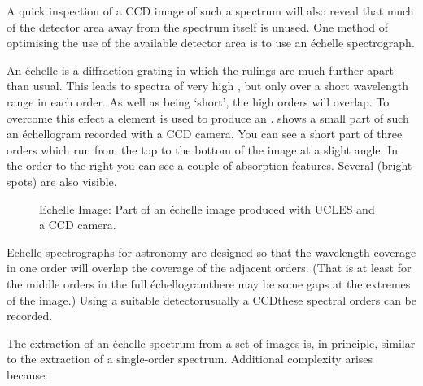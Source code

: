 A quick inspection of a CCD image of such a spectrum will also reveal
that much of the detector area away from the spectrum itself is unused.
One method of optimising the use of the available detector area is to
use an \'{e}chelle spectrograph.

An \'{e}chelle is a diffraction grating in which the rulings are much
further apart than usual.
This leads to spectra of very high ,
but only over a short wavelength range in each order.
As well as being `short', the high orders will overlap.  To overcome
this effect a 
element is used to produce an
.
shows a small part of such
an \'{e}chellogram recorded with a CCD camera.  You can see a short part
of three orders which run from the top to the bottom of the image at a
slight angle.  In the order to the right you can see a couple of
absorption features.  Several 
(bright spots) are also visible.

\begin{figure}
\begin{center}
{\leavevmode\epsfysize=136mm}

\parbox{140mm}{
\caption{Echelle Image: Part of an \'{e}chelle image produced with UCLES
         and a CCD camera.}
\label{fi_ech_image}
}
\end{center}
\end{figure}

Echelle spectrographs for astronomy are designed so that the wavelength
coverage in one order will overlap the coverage of the adjacent orders.
(That is at least for the middle orders in the full
\'{e}chellogram\sgspec{---}{ - }there
may be some gaps at the extremes of the image.)  Using a suitable
detector\sgspec{--}{-}usually a CCD\sgspec{---}{ - }these spectral
orders can be recorded.

The extraction of an \'{e}chelle spectrum from a set of images is, in
principle, similar to the extraction of a single-order spectrum.
Additional complexity arises because:

